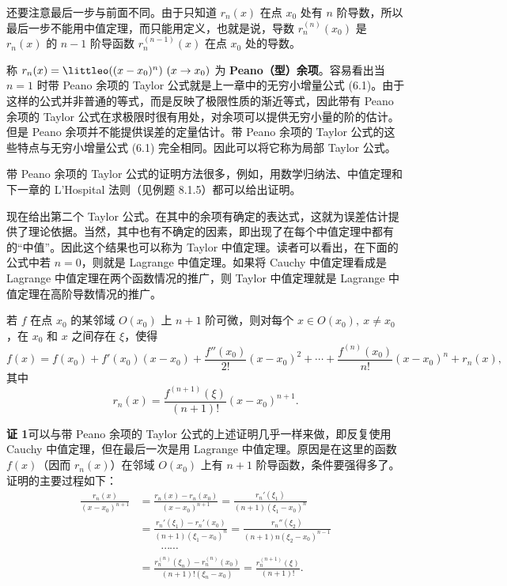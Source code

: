 \begin{xproof}
还要注意最后一步与前面不同。由于只知道 $r_n(x)$ 在点 $x_0$ 处有 $n$ 阶导数，所以最后一步不能用中值定理，而只能用定义，也就是说，导数 $r_n^{(n)}(x_0)$ 是 $r_n(x)$ 的 $n-1$ 阶导函数 $r_n^{(n-1)}(x)$ 在点 $x_0$ 处的导数。
\end{xproof}

\begin{xremark}
称 $r_n(x)=\littleo((x-x_0)^n)\ (x\to x_0)$ 为 \textbf{Peano（型）余项}。容易看出当 $n=1$ 时带 Peano 余项的 Taylor 公式就是上一章中的无穷小增量公式 (6.1)。由于这样的公式并非普通的等式，而是反映了极限性质的渐近等式，因此带有 Peano 余项的 Taylor 公式在求极限时很有用处，对余项可以提供无穷小量的阶的估计。但是 Peano 余项并不能提供误差的定量估计。带 Peano 余项的 Taylor 公式的这些特点与无穷小增量公式 (6.1) 完全相同。因此可以将它称为局部 Taylor 公式。
\end{xremark}

\begin{xremark}
带 Peano 余项的 Taylor 公式的证明方法很多，例如，用数学归纳法、中值定理和下一章的 L'Hospital 法则（见例题 8.1.5）都可以给出证明。
\end{xremark}

现在给出第二个 Taylor 公式。在其中的余项有确定的表达式，这就为误差估计提供了理论依据。当然，其中也有不确定的因素，即出现了在每个中值定理中都有的“中值”。因此这个结果也可以称为 Taylor 中值定理。读者可以看出，在下面的公式中若 $n=0$，则就是 Lagrange 中值定理。如果将 Cauchy 中值定理看成是 Lagrange 中值定理在两个函数情况的推广，则 Taylor 中值定理就是 Lagrange 中值定理在高阶导数情况的推广。

\begin{xproposition}
若 $f$ 在点 $x_0$ 的某邻域 $O(x_0)$ 上 $n+1$ 阶可微，则对每个 $x\in O(x_0),\ x\neq x_0$，在 $x_0$ 和 $x$ 之间存在 $\xi$，使得
\[
  f(x)=f(x_0)+f'(x_0)(x-x_0)+\frac{f''(x_0)}{2!}(x-x_0)^2+\cdots+\frac{f^{(n)}(x_0)}{n!}(x-x_0)^n+r_n(x),
\]
其中
\[
  r_n(x)=\frac{f^{(n+1)}(\xi)}{(n+1)!}(x-x_0)^{n+1}.
\]
\end{xproposition}
\begin{xproof}
\textbf{证 1}\quad 可以与带 Peano 余项的 Taylor 公式的上述证明几乎一样来做，即反复使用 Cauchy 中值定理，但在最后一次是用 Lagrange 中值定理。原因是在这里的函数 $f(x)$（因而 $r_n(x)$）在邻域 $O(x_0)$ 上有 $n+1$ 阶导函数，条件要强得多了。证明的主要过程如下：
\[
  \begin{aligned}
  \frac{r_n(x)}{(x-x_0)^{n+1}}
  &=\frac{r_n(x)-r_n(x_0)}{(x-x_0)^{n+1}}
   =\frac{r_n'(\xi_1)}{(n+1)(\xi_1-x_0)^n}\\
  &=\frac{r_n'(\xi_1)-r_n'(x_0)}{(n+1)(\xi_1-x_0)^n}
   =\frac{r_n''(\xi_2)}{(n+1)n(\xi_2-x_0)^{n-1}}\\
  &\qquad\cdots\cdots\\
  &=\frac{r_n^{(n)}(\xi_n)-r_n^{(n)}(x_0)}{(n+1)!(\xi_n-x_0)}
   =\frac{r_n^{(n+1)}(\xi)}{(n+1)!}.
  \end{aligned}
\]
\end{xproof}

